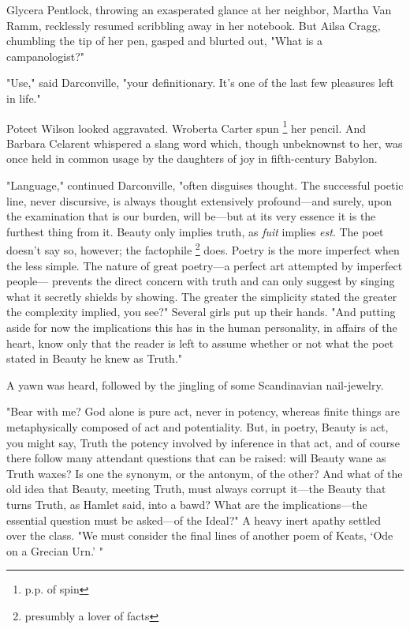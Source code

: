   Glycera Pentlock, throwing an exasperated 
glance at her neighbor, Martha Van Ramm, recklessly resumed scribbling away in 
her notebook. But Ailsa Cragg, chumbling 
the tip of her pen, gasped and blurted 
out, "What is a campanologist?"

  "Use," said Darconville, "your definitionary. It's one of the last few
pleasures left in life."

  Poteet Wilson looked aggravated. 
Wroberta Carter spun 
\footnote{ p.p. of spin}
her pencil. And Barbara
Celarent whispered a slang word which, though unbeknownst to her, was once held
in common usage by the daughters of joy in fifth-century Babylon.

  "Language," continued Darconville, "often disguises thought. The successful
poetic line, never discursive, is always thought extensively profound---and
surely, upon the examination that is our burden, will be---but at its very 
essence it is the furthest thing from it. Beauty only implies truth, as
\textit{fuit} implies \textit{est}. The poet doesn't say so, however; the 
factophile 
\footnote{ \textdbend presumbly a lover of facts}
does. Poetry is the more
imperfect when the less simple. The nature of great poetry---a perfect art
attempted by imperfect people--- prevents the direct concern with truth and can
only suggest by singing what it secretly shields by showing. The greater the
simplicity stated the greater the complexity implied, you see?" Several girls
put up their hands. "And putting aside for now the implications this has in the
human personality, in affairs of the heart, know only that the reader is left to
assume whether or not what the poet stated in Beauty he knew as Truth."

  A yawn was heard, followed by the jingling of some Scandinavian nail-jewelry.

  "Bear with me? God alone is pure act, never in potency, whereas finite things
are metaphysically composed of act and potentiality. But, in poetry, Beauty is
act, you might say, Truth the potency involved by inference in that act, and of
course there follow many attendant questions that can be raised: will Beauty
wane 
as Truth waxes? 
Is one the synonym, or the antonym, of the other? And what
of the old idea that Beauty, meeting Truth, must always corrupt it---the Beauty
that turns Truth, as Hamlet said, into a bawd? 
What are the implications---the
essential question must be asked---of the Ideal?" A heavy inert apathy settled
over the class. "We must consider the final lines of another poem of Keats, 
`Ode on a Grecian Urn.' "

